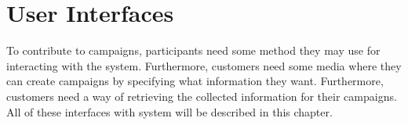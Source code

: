 
\chapter{User Interfaces}
\label{cha:user_interfaces}

To contribute to campaigns, participants need some method they may use for interacting with the system. Furthermore, customers need some media where they can create campaigns by specifying what information they want. Furthermore, customers need a way of retrieving the collected information for their campaigns. All of these interfaces with system will be described in this chapter.



